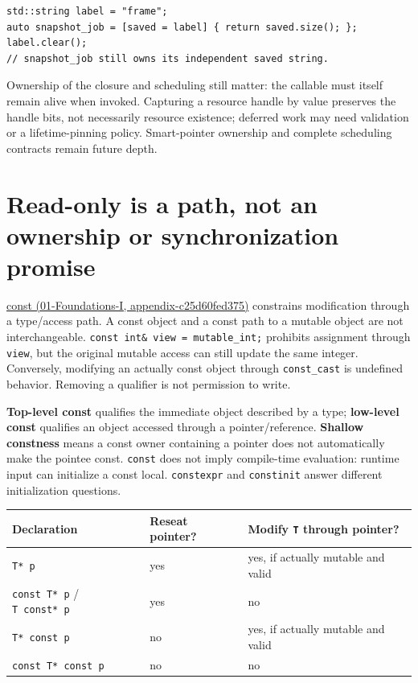 \begin{verbatim}
std::string label = "frame";
auto snapshot_job = [saved = label] { return saved.size(); };
label.clear();
// snapshot_job still owns its independent saved string.
\end{verbatim}

Ownership of the closure and scheduling still matter: the callable must itself remain alive when invoked. Capturing a resource handle by value preserves the handle bits, not necessarily resource existence; deferred work may need validation or a lifetime-pinning policy. Smart-pointer ownership and complete scheduling contracts remain future depth.

\section{Read-only is a path, not an ownership or synchronization promise}\label{05-engine-i-ch003-read-only-is-a-path-not-an-ownership-or-synchronization-promise}

\href{../01-Foundations-I/main.pdf\#nameddest=appendix-c25d60fed375}{const (01-Foundations-I, appendix-c25d60fed375)} constrains modification through a type/access path. A const object and a const path to a mutable object are not interchangeable. \texttt{const\ int\&\ view\ =\ mutable\_int;} prohibits assignment through \texttt{view}, but the original mutable access can still update the same integer. Conversely, modifying an actually const object through \texttt{const\_cast} is undefined behavior. Removing a qualifier is not permission to write.

\textbf{Top-level const} qualifies the immediate object described by a type; \textbf{low-level const} qualifies an object accessed through a pointer/reference. \textbf{Shallow constness} means a const owner containing a pointer does not automatically make the pointee const. \texttt{const} does not imply compile-time evaluation: runtime input can initialize a const local. \texttt{constexpr} and \texttt{constinit} answer different initialization questions.

{\def\LTcaptype{none} %
\begin{longtable}[]{@{}lll@{}}
\toprule\noalign{}
Declaration & Reseat pointer? & Modify \texttt{T} through pointer? \\
\midrule\noalign{}
\endhead
\bottomrule\noalign{}
\endlastfoot
\texttt{T*\ p} & yes & yes, if actually mutable and valid \\
\texttt{const\ T*\ p} / \texttt{T\ const*\ p} & yes & no \\
\texttt{T*\ const\ p} & no & yes, if actually mutable and valid \\
\texttt{const\ T*\ const\ p} & no & no \\
\end{longtable}
}

